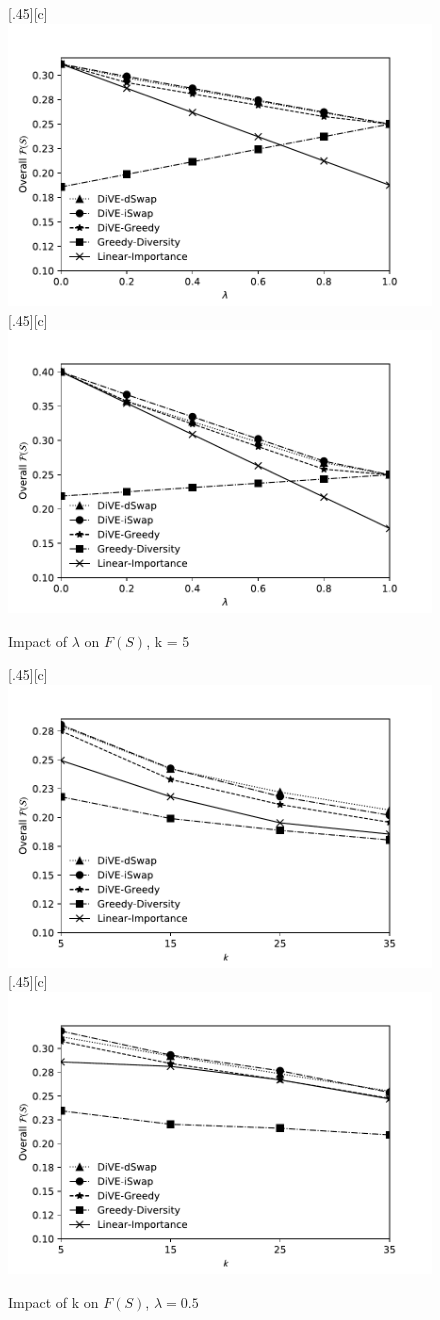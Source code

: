 \begin{figure}[t]
	\centering
	[.45\linewidth][c]{%
		\includegraphics[width=.45\linewidth]{figures/results/tradeoff_heart_2}}
	[.45\linewidth][c]{%
		\includegraphics[width=.45\linewidth]{figures/results/tradeoff_flights}}
	\caption{Impact of $\lambda$ on $F\left(S\right)$, k = 5}
	\label{fig:tradeoff_3_datasets}	
\end{figure}

\begin{figure}[t]
	\centering
	[.45\linewidth][c]{%
		\includegraphics[width=.45\linewidth]{figures/results/objf_heart_2}}
	[.45\linewidth][c]{%
		\includegraphics[width=.45\linewidth]{figures/results/objf_flights}}
	\caption{Impact of k on $F\left(S\right)$, $\lambda = 0.5$}
	\label{fig:objf_3_datasets}
\end{figure}

